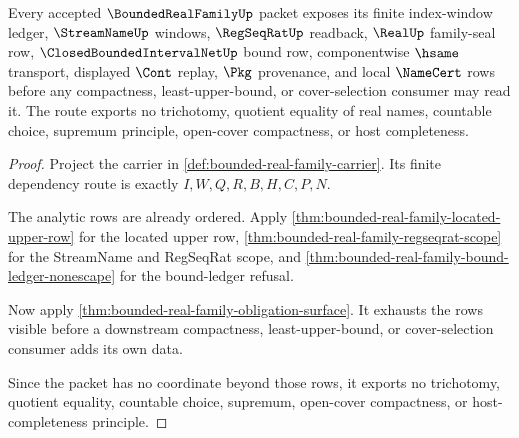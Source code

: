 \begin{theorem}
\label{thm:bounded-real-family-scoped-dependency-route}
Every accepted $\BoundedRealFamilyUp$ packet exposes its finite index-window ledger, $\StreamNameUp$ windows, $\RegSeqRatUp$ readback, $\RealUp$ family-seal row, $\ClosedBoundedIntervalNetUp$ bound row, componentwise $\hsame$ transport, displayed $\Cont$ replay, $\Pkg$ provenance, and local $\NameCert$ rows before any compactness, least-upper-bound, or cover-selection consumer may read it. The route exports no trichotomy, quotient equality of real names, countable choice, supremum principle, open-cover compactness, or host completeness.
\end{theorem}
\begin{proof}
Project the carrier in \autoref{def:bounded-real-family-carrier}. Its finite dependency route is exactly $I,W,Q,R,B,H,C,P,N$.

The analytic rows are already ordered. Apply \autoref{thm:bounded-real-family-located-upper-row} for the located upper row, \autoref{thm:bounded-real-family-regseqrat-scope} for the StreamName and RegSeqRat scope, and \autoref{thm:bounded-real-family-bound-ledger-nonescape} for the bound-ledger refusal.

Now apply \autoref{thm:bounded-real-family-obligation-surface}. It exhausts the rows visible before a downstream compactness, least-upper-bound, or cover-selection consumer adds its own data.

Since the packet has no coordinate beyond those rows, it exports no trichotomy, quotient equality, countable choice, supremum, open-cover compactness, or host-completeness principle.
\end{proof}

